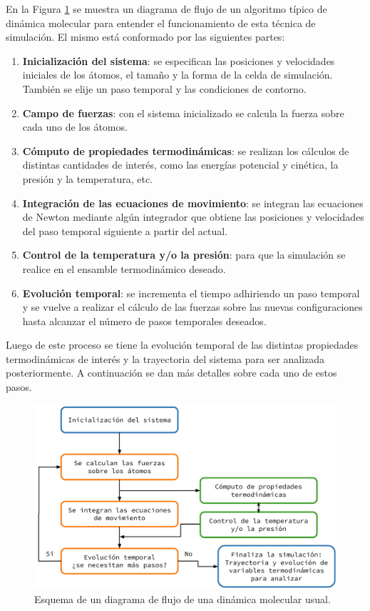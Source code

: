 En la Figura \ref{fig:esquema_md} se muestra un diagrama de flujo de un algoritmo
típico de dinámica molecular para entender el funcionamiento de esta técnica de 
simulación. El mismo está conformado por las siguientes partes:
\begin{enumerate}
    \item \textbf{Inicialización del sistema}: se especifican las posiciones y
        velocidades iniciales de los átomos, el tamaño y la forma de la celda de 
        simulación. También se elije un paso temporal y las condiciones de 
        contorno.
    \item \textbf{Campo de fuerzas}: con el sistema inicializado se calcula la 
        fuerza sobre cada uno de los átomos.
    \item \textbf{Cómputo de propiedades termodinámicas}: se realizan los
        cálculos de distintas cantidades de interés, como las energías potencial
        y cinética, la presión y la temperatura, etc.
    \item \textbf{Integración de las ecuaciones de movimiento}: se integran las
        ecuaciones de Newton mediante algún integrador que obtiene las posiciones
        y velocidades del paso temporal siguiente a partir del actual.
    \item \textbf{Control de la temperatura y/o la presión}: para que la 
        simulación se realice en el ensamble termodinámico deseado.
    \item \textbf{Evolución temporal}: se incrementa el tiempo adhiriendo un
        paso temporal y se vuelve a realizar el cálculo de las fuerzas sobre las 
        nuevas configuraciones hasta alcanzar el número de pasos temporales 
        deseados.
\end{enumerate}
Luego de este proceso se tiene la evolución temporal de las distintas propiedades
termodinámicas de interés y la trayectoria del sistema para ser analizada 
posteriormente. A continuación se dan más detalles sobre cada uno de estos pasos.

\begin{figure}
    \centering
    \includegraphics[width=\textwidth]{Metodos/MD/esquema.png}
    \caption{Esquema de un diagrama de flujo de una dinámica molecular usual.}
    \label{fig:esquema_md}
\end{figure}


